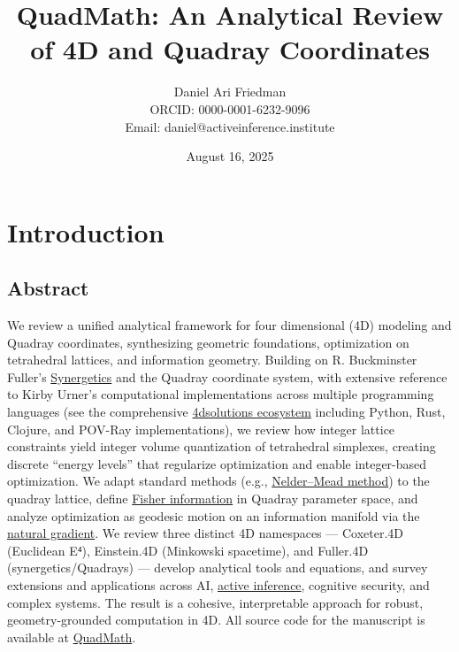 \documentclass[
  10pt,
]{article}
\title{QuadMath: An Analytical Review of 4D and Quadray Coordinates}
\author{Daniel Ari Friedman\\ ORCID: 0000-0001-6232-9096\\ Email: daniel@activeinference.institute}
\date{August 16, 2025}
\begin{document}
\maketitle

{
\hypersetup{linkcolor=black}
\setcounter{tocdepth}{3}
\tableofcontents
}
\hypertarget{introduction}{%
\section{Introduction}\label{introduction}}

\hypertarget{abstract}{%
\subsection{Abstract}\label{abstract}}

We review a unified analytical framework for four dimensional (4D)
modeling and Quadray coordinates, synthesizing geometric foundations,
optimization on tetrahedral lattices, and information geometry. Building
on R. Buckminster Fuller's
\href{https://en.wikipedia.org/wiki/Synergetics_(Fuller)}{Synergetics}
and the Quadray coordinate system, with extensive reference to Kirby
Urner's computational implementations across multiple programming
languages (see the comprehensive
\href{https://github.com/4dsolutions}{4dsolutions ecosystem} including
Python, Rust, Clojure, and POV-Ray implementations), we review how
integer lattice constraints yield integer volume quantization of
tetrahedral simplexes, creating discrete ``energy levels'' that
regularize optimization and enable integer-based optimization. We adapt
standard methods (e.g.,
\href{https://en.wikipedia.org/wiki/Nelder\%E2\%80\%93Mead_method}{Nelder--Mead
method}) to the quadray lattice, define
\href{https://en.wikipedia.org/wiki/Fisher_information}{Fisher
information} in Quadray parameter space, and analyze optimization as
geodesic motion on an information manifold via the
\href{https://en.wikipedia.org/wiki/Natural_gradient}{natural gradient}.
We review three distinct 4D namespaces --- Coxeter.4D (Euclidean E⁴),
Einstein.4D (Minkowski spacetime), and Fuller.4D (synergetics/Quadrays)
--- develop analytical tools and equations, and survey extensions and
applications across AI,
\href{https://welcome.activeinference.institute/}{active inference},
cognitive security, and complex systems. The result is a cohesive,
interpretable approach for robust, geometry-grounded computation in 4D.
All source code for the manuscript is available at
\href{https://github.com/docxology/quadmath}{QuadMath}.
\end{document}
